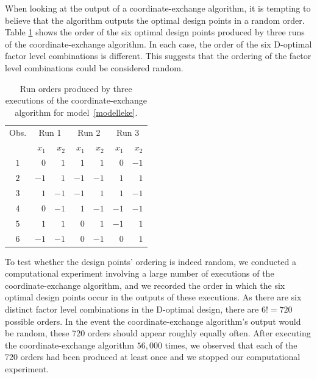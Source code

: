 When looking at the output of a coordinate-exchange algorithm, it is tempting to believe that the algorithm outputs the optimal design points in a random order. Table \ref{ordersof3starts} shows the order of the six optimal design points produced by three runs of the coordinate-exchange algorithm. In each case, the order of the six D-optimal factor level combinations is different. This suggests that the ordering of the factor level combinations could be considered random.\\

\begin{table}
\caption{Run orders produced by three executions of the coordinate-exchange algorithm for model~\eqref{modelleke}.}
\begin{center}
\label{ordersof3starts}
\begin{tabular}{|c|rr|rr|rr|}
\hline 
Obs. & \multicolumn{2}{|c|}{Run 1} & \multicolumn{2}{|c|}{Run 2} & \multicolumn{2}{|c|}{Run 3}\\
& $x_1$ & $x_2$ & $x_1$ & $x_2$& $x_1$ & $x_2$\\
\hline
$1	$&$	0	$&$	1	$&$	1	$&$	1	$&$	0	$&$	-1	 $\\
$2	$&$	-1	$&$	1	$&$	-1	$&$	-1	$&$	1	$&$	1	 $\\
$3	$&$	1	$&$	-1	$&$	-1	$&$	1	$&$	1	$&$	-1	 $\\
$4	$&$	0	$&$	-1	$&$	1	$&$	-1	$&$	-1	$&$	-1	 $\\
$5	$&$	1	$&$	1	$&$	0	$&$	1	$&$	-1	$&$	1	 $\\
$6	$&$	-1	$&$	-1	$&$	0	$&$	-1	$&$	0	$&$	1	 $\\
\hline
\end{tabular}
\end{center}
\end{table}

To test whether the design points' ordering is indeed random, we conducted a computational experiment involving a large number of executions of the coordinate-exchange algorithm, and we recorded the order in which the six optimal design points occur in the outputs of these executions. As there are six distinct factor level combinations in the D-optimal design, there are $6!=720$ possible orders. In the event the coordinate-exchange algorithm's output would be random, these 720 orders should appear roughly equally often. After executing the coordinate-exchange algorithm $56,000$ times, we observed that each of the 720 orders had been produced at least once and we stopped our computational experiment.\\

